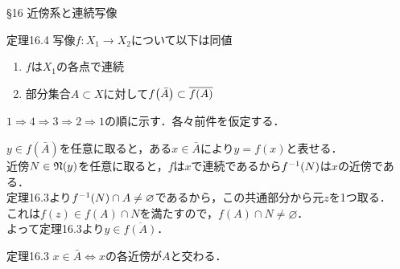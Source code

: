 \documentclass[uplatex,a4paper,dvipdfmx,aspectratio=169,11pt]{beamer}
\begin{document}
\begin{frame}[fragile]{\S 16 近傍系と連続写像}
    \begin{block}{定理16.4}
        写像$f \colon X_1 \to X_2$について以下は同値
        \begin{enumerate}
            \item $f$は$X_1$の各点で連続
            \item[4.] 部分集合$A \subset X$に対して$f \qty(\bar A) \subset \overline{f(A)}$
        \end{enumerate}
    \end{block}

     \quad $1 \Rightarrow 4 \Rightarrow 3 \Rightarrow 2 \Rightarrow 1$の順に示す．各々前件を仮定する．

    \begin{description}[$1 \Rightarrow 4$:]
        \item[$1 \Rightarrow 4$:] $y \in f(\bar A)$を任意に取ると，ある$x \in \bar A$により$y = f(x)$と表せる．\\
            近傍$N \in \mathord{\mathfrak{N}}\qty(y)$を任意に取ると，$f$は$x$で連続であるから$f^{\mathrm{-1}}(N)$は$x$の近傍である．\\
            定理16.3より$f^{\mathrm{-1}}(N) \cap A \neq \varnothing$であるから，この共通部分から元$z$を1つ取る．\\
            これは$f(z) \in f(A) \cap N$を満たすので，$f(A) \cap N \neq \varnothing$．\\よって定理16.3より$y \in \overline{f(A)}$．
    \end{description}
    \begin{block}{定理16.3}
        $x \in \bar A \iff x$の各近傍が$A$と交わる．
    \end{block}
\end{frame}
\end{document}
